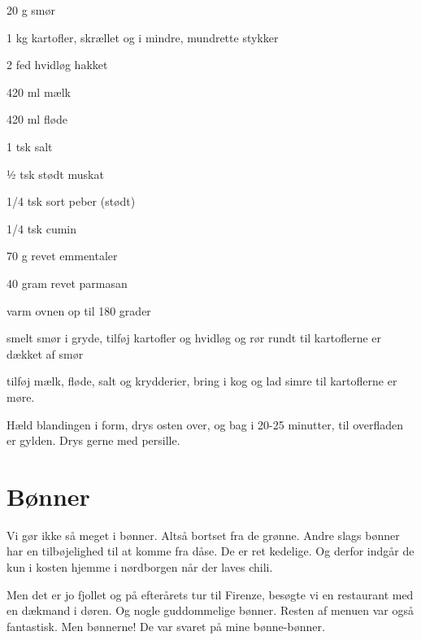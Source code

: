 \documentclass[
]{book}
\begin{document}
20 g smør

1 kg kartofler, skrællet og i mindre, mundrette stykker

2 fed hvidløg hakket

420 ml mælk

420 ml fløde

1 tsk salt

½ tsk stødt muskat

1/4 tsk sort peber (stødt)

1/4 tsk cumin

70 g revet emmentaler

40 gram revet parmasan

varm ovnen op til 180 grader

smelt smør i gryde, tilføj kartofler og hvidløg og rør rundt til kartoflerne er dækket af smør

tilføj mælk, fløde, salt og krydderier, bring i kog og lad simre til kartoflerne er møre.

Hæld blandingen i form, drys osten over, og bag i 20-25 minutter, til overfladen er gylden. Drys gerne med persille.

\section{Bønner}\label{buxf8nner}

Vi gør ikke så meget i bønner. Altså bortset fra de grønne. Andre slags bønner har en tilbøjelighed til at komme fra dåse. De er ret kedelige. Og derfor indgår de kun i kosten hjemme i nørdborgen når der laves chili.

Men det er jo fjollet og på efterårets tur til Firenze, besøgte vi en restaurant med en dækmand i døren. Og nogle guddommelige bønner. Resten af menuen var også fantastisk. Men bønnerne! De var svaret på mine bønne-bønner.
\end{document}
